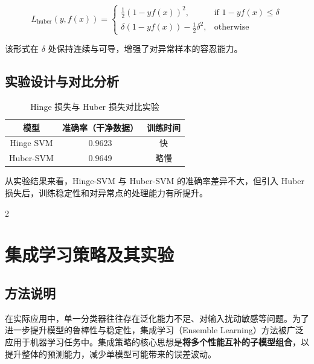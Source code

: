 \documentclass[twoside,dvipsnames]{CUGThesis}
\begin{document}
\[
L_{\text{huber}}(y, f(x)) = \begin{cases} 
\frac{1}{2}(1 - y f(x))^2, & \text{if } 1 - y f(x) \leq \delta \\
\delta(1 - y f(x)) - \frac{1}{2}\delta^2, & \text{otherwise}
\end{cases}
\]

该形式在 \( \delta \) 处保持连续与可导，增强了对异常样本的容忍能力。

\subsection{实验设计与对比分析}

\begin{table}[H]
    \centering
    \begin{tabular}{|c|c|c|}
        \hline
        \textbf{模型} & \textbf{准确率（干净数据）} & \textbf{训练时间} \\
        \hline
        Hinge SVM & 0.9623 & 快 \\
        Huber-SVM & 0.9649 & 略慢 \\
        \hline
    \end{tabular}
    \caption{Hinge 损失与 Huber 损失对比实验}
    \label{tab:huber_vs_hinge}
\end{table}

从实验结果来看，Hinge-SVM 与 Huber-SVM 的准确率差异不大，但引入 Huber 损失后，训练稳定性和对异常点的处理能力有所提升。

        

        
        


        
        \newpage
        \begin{spacing}{2}
		\section{集成学习策略及其实验}
	\end{spacing}

\subsection{方法说明}

在实际应用中，单一分类器往往存在泛化能力不足、对输入扰动敏感等问题。为了进一步提升模型的鲁棒性与稳定性，集成学习（Ensemble Learning）方法被广泛应用于机器学习任务中。集成策略的核心思想是\textbf{将多个性能互补的子模型组合}，以提升整体的预测能力，减少单模型可能带来的误差波动。
\end{document}
